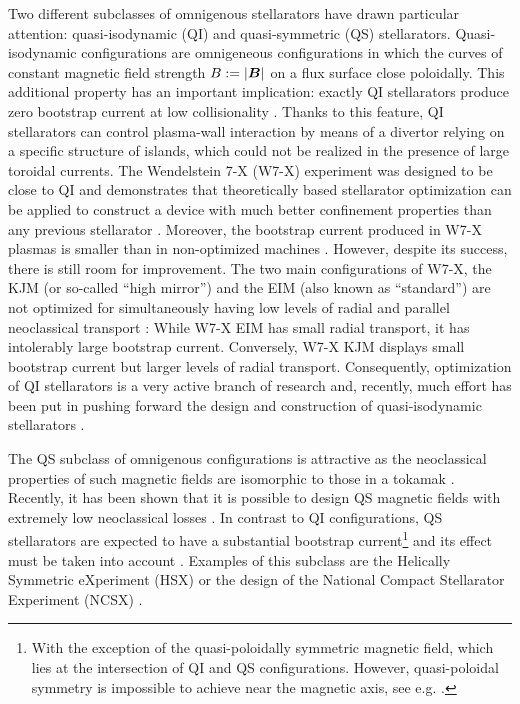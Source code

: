 \documentclass[10pt]{iopart}
\begin{document}
Two different subclasses of omnigenous stellarators have drawn particular attention: quasi-isodynamic (QI) and quasi-symmetric (QS) stellarators. Quasi-isodynamic configurations are omnigeneous configurations in which the curves of constant magnetic field strength $B:=|\vb*{B}|$ on a flux surface close poloidally. This additional property has an important implication: exactly QI stellarators produce zero bootstrap current at low collisionality \cite{Helander_2009,Helander_2011_Bootstrap}. Thanks to this feature, QI stellarators can control plasma-wall interaction by means of a divertor relying on a specific structure of islands, which could not be realized in the presence of large toroidal currents. The Wendelstein 7-X (W7-X) experiment was designed to be close to QI and demonstrates that theoretically based stellarator optimization can be applied to construct a device with much better confinement properties than any previous stellarator \cite{Beidler2021}. Moreover, the bootstrap current produced in W7-X plasmas is smaller than in non-optimized machines \cite{Dinklage2018}. However, despite its success, there is still room for improvement. The two main configurations of W7-X, the KJM (or so-called ``high mirror'') and the EIM (also known as ``standard'') are not optimized for simultaneously having low levels of radial and parallel neoclassical transport \cite{Beidler_2011, Beidler2021}: While W7-X EIM has small radial transport, it has intolerably large bootstrap current. Conversely, W7-X KJM displays small bootstrap current but larger levels of radial transport. Consequently, optimization of QI stellarators is a very active branch of research and, recently, much effort has been put in pushing forward the design and construction of quasi-isodynamic stellarators \cite{Sanchez_2023,velasco2023robust,RJorge_2022,camachomata_plunk_jorge_2022,goodman2022constructing}.

The QS subclass of omnigenous configurations is attractive as the neoclassical properties of such magnetic fields are isomorphic to those in a tokamak \cite{Pytte_Isomorphic,Boozer_Isomorphic}. Recently, it has been shown that it is possible to design QS magnetic fields with extremely low neoclassical losses \cite{Landreman_PreciseQS}. In contrast to QI configurations, QS stellarators are expected to have a substantial bootstrap current\footnote{With the exception of the quasi-poloidally symmetric magnetic field, which lies at the intersection of QI and QS configurations. However, quasi-poloidal symmetry is impossible to achieve near the magnetic axis, see e.g. \cite{Helander_2014}.} and its effect must be taken into account \cite{Landreman_SelfConsistent}. Examples of this subclass are the Helically Symmetric eXperiment (HSX) \cite{HSX} or the design of the National Compact Stellarator Experiment (NCSX) \cite{NCSX}. 
\end{document}
